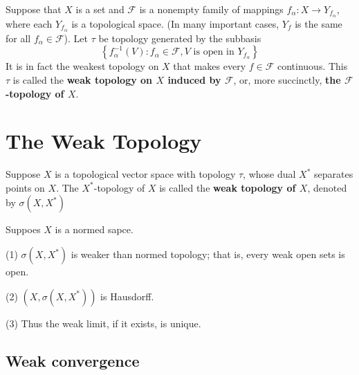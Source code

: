 \documentclass[12pt, oneside]{book}
\begin{document}
\begin{definition}
    Suppose that $X$ is a set and $\mathscr{F}$ is a nonempty family of mappings $f_\alpha: X \rightarrow Y_{f_\alpha}$, where each $Y_{f_\alpha}$ is a topological space. (In many important cases, $Y_f$ is the same for all $f_\alpha \in \mathscr{F}$).
    Let $\tau$ be topology generated by the subbasis
    \begin{equation*}
        \left\{
        f_\alpha^{-1}(V) : f_\alpha\in \mathscr{F}
        , V \text{ is open in } Y_{f_\alpha}
        \right\}
    \end{equation*}
    It is in fact the weakest topology on $X$ that makes every $f \in \mathscr{F}$ continuous. This $\tau$ is called the \textbf{weak topology on $X$ induced by $\mathscr{F}$}, or, more succinctly, \textbf{the  $\mathscr{F}$-topology of $X$}.
\end{definition}









\section{The Weak Topology}

\begin{definition}
    Suppose $X$ is a topological vector space with topology $\tau$, whose dual $X^*$ separates points on $X$.
    The $X^*$-topology of $X$ is called the \textbf{weak topology of $X$}, denoted by $\sigma\left(X,X^*\right)$
\end{definition}


\begin{proposition}
    Suppoes $X$ is a normed sapce.

    (1) $\sigma\left(X,X^*\right)$ is weaker than normed topology; that is, every weak open sets is open.

    (2) $\left(X, \sigma\left(X,X^*\right)\right)$ is Hausdorff.

    (3) Thus the weak limit, if it exists, is unique.
\end{proposition}

\subsection{Weak convergence}
\end{document}

